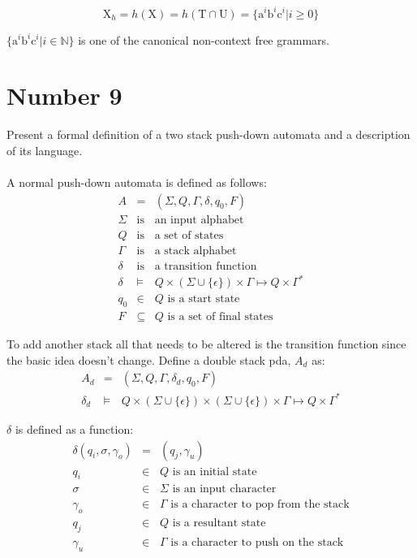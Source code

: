\documentclass[12pt,a4paper,twoside]{article}  %
\begin{document}
\begin{equation}
\textrm{X}_h = h(\textrm{X}) = h(\textrm{T} \cap \textrm{U}) =
  \{\textrm{a}^i\textrm{b}^i\textrm{c}^i | i \geq 0\}
\end{equation}

$\{\textrm{a}^i\textrm{b}^i\textrm{c}^i | i \in \mathbb{N}\}$ is one
of the canonical non-context free grammars.

\section{Number 9}

Present a formal definition of a two stack push-down automata and a
description of its language.\\\\
A normal push-down automata is defined as follows:
\begin{eqnarray}
A      &=&           (\Sigma, Q, \Gamma, \delta, q_0, F) \\
\Sigma &\textrm{is}& \textrm{an input alphabet} \nonumber\\
Q      &\textrm{is}& \textrm{a set of states} \nonumber\\
\Gamma &\textrm{is}& \textrm{a stack alphabet} \nonumber\\
\delta &\textrm{is}& \textrm{a transition function} \nonumber\\
\delta &\models& Q\times(\Sigma \cup\{\epsilon\})\times\Gamma
                  \mapsto Q\times\Gamma^* \\
q_0    &\in& Q \textrm{ is a start state} \nonumber\\
F      &\subseteq& Q \textrm{ is a set of final states} \nonumber
\end{eqnarray}

To add another stack all that needs to be altered is the transition
function since the basic idea doesn't change. Define a double stack
pda, $A_d$ as:
\begin{eqnarray}
A_d      &=& (\Sigma, Q, \Gamma, \delta_d, q_0, F) \\
\delta_d &\models& Q\times(\Sigma \cup\{\epsilon\})
                   \times(\Sigma \cup\{\epsilon\})\times\Gamma
                   \mapsto Q\times\Gamma^*
\end{eqnarray}

$\delta$ is defined as a function:
\begin{eqnarray}
\delta(q_i, \sigma, \gamma_o) &=& (q_j, \gamma_u) \\
q_i  &\in& Q \textrm{ is an initial state} \nonumber\\
\sigma &\in& \Sigma \textrm{ is an input character} \nonumber\\
\gamma_o  &\in& \Gamma \textrm{ is a character to pop from the stack}
  \nonumber\\
q_j  &\in& Q \textrm{ is a resultant state} \nonumber\\
\gamma_u  &\in& \Gamma \textrm{ is a character to push on the stack}
  \nonumber
\end{eqnarray}
\end{document}
